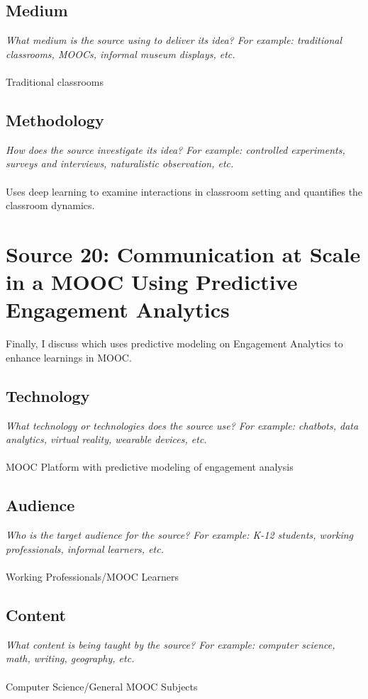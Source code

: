 \documentclass[12pt, final]{article}
\begin{document}
\subsection{Medium}
\textit{What medium is the source using to deliver its idea? For example: traditional classrooms, MOOCs, informal museum displays, etc.}
\\
\\
Traditional classrooms

\subsection{Methodology}
\textit{How does the source investigate its idea? For example: controlled experiments, surveys and interviews, naturalistic observation, etc.}
\\
\\
Uses deep learning to examine interactions in classroom setting and quantifies the classroom dynamics.

\section{Source 20: Communication at Scale in a MOOC Using Predictive Engagement Analytics}
\label{Source 20}

Finally, I discuss \cite{Le} which uses predictive modeling on Engagement Analytics to enhance learnings in MOOC.

\subsection{Technology}
\textit{What technology or technologies does the source use? For example: chatbots, data analytics, virtual reality, wearable devices, etc.}
\\
\\
MOOC Platform with predictive modeling of engagement analysis

\subsection{Audience}
\textit{Who is the target audience for the source? For example: K-12 students, working professionals, informal learners, etc.}
\\
\\
Working Professionals/MOOC Learners

\subsection{Content}
\textit{What content is being taught by the source? For example: computer science, math, writing, geography, etc.}
\\
\\
Computer Science/General MOOC Subjects
\end{document}
